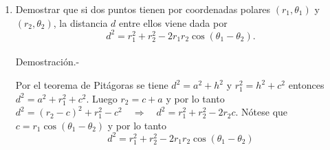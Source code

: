 \begin{enumerate}[\bfseries 1.]

    \item Demostrar que si dos puntos tienen por coordenadas polares $(r_1,\theta_1)$ y $(r_2,\theta_2)$, la distancia $d$ entre ellos viene dada por $$d^2 = r_1^2 + r_2^2 - 2r_1 r_2 \cos(\theta_1 - \theta_2).$$\\
	Demostración.-\; 
	\begin{center}
	\end{center}
	Por el teorema de Pitágoras se tiene $d^2 = a^2 + h^2$ y $r_1^2 = h^2 + c^2$ entonces $d^2 = a^2 + r_1^2 + c^2$. Luego $r_2 = c+a$ y por lo tanto $d^2 =  (r_2 - c)^2 + r_1^2 - c^2 \quad  \Rightarrow \quad d^2 = r_1^2 + r_2^2 - 2r_2c$. Nótese que $c=r_1\cos(\theta_1-\theta_2)$ y por lo tanto $$d^2 = r_1^2 + r_2^2 - 2r_1 r_2 \cos(\theta_1 - \theta_2)$$\\

\end{enumerate}
